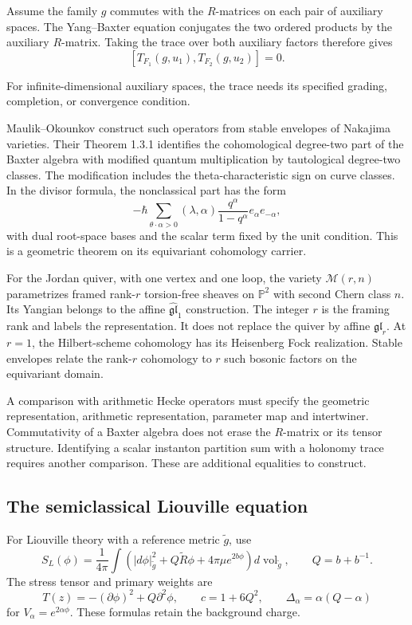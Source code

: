 Assume the family $g$ commutes with the $R$-matrices on each pair of
auxiliary spaces. The Yang--Baxter equation conjugates the two ordered
products by the auxiliary $R$-matrix. Taking the trace over both auxiliary
factors therefore gives
\[
 [T_{F_1}(g,u_1),T_{F_2}(g,u_2)]=0.
\]

For infinite-dimensional auxiliary spaces, the trace needs its specified
grading, completion, or convergence condition.

Maulik--Okounkov construct such operators from stable envelopes of Nakajima
varieties. Their Theorem 1.3.1 identifies the cohomological degree-two part
of the Baxter algebra with modified quantum multiplication by tautological
degree-two classes. The modification includes the theta-characteristic sign
on curve classes. In the divisor formula, the nonclassical part has the form
\[
 -\hbar\sum_{\theta\cdot\alpha>0}
     (\lambda,\alpha)\frac{q^\alpha}{1-q^\alpha}
                   e_\alpha e_{-\alpha},
\]
with dual root-space bases and the scalar term fixed by the unit condition.
This is a geometric theorem on its equivariant cohomology carrier.

For the Jordan quiver, with one vertex and one loop, the variety $\mathcal
M(r,n)$ parametrizes framed rank-$r$ torsion-free sheaves on $\mathbb P^2$
with second Chern class $n$. Its Yangian belongs to the affine
$\widehat{\mathfrak{gl}}_1$ construction. The integer $r$ is the framing
rank and labels the representation. It does not replace the quiver by affine
$\mathfrak{gl}_r$. At $r=1$, the Hilbert-scheme cohomology has its
Heisenberg Fock realization. Stable envelopes relate the rank-$r$ cohomology
to $r$ such bosonic factors on the equivariant domain.

A comparison with arithmetic Hecke operators must specify the geometric
representation, arithmetic representation, parameter map and intertwiner.
Commutativity of a Baxter algebra does not erase the $R$-matrix or its
tensor structure. Identifying a scalar instanton partition sum with a
holonomy trace requires another comparison. These are additional equalities
to construct.

\subsection{The semiclassical Liouville equation}

For Liouville theory with a reference metric $\widetilde g$, use
\[
 S_L(\phi)=\frac1{4\pi}\int
    \left(|d\phi|_{\widetilde g}^2+
          Q\widetilde R\phi+4\pi\mu e^{2b\phi}\right)
                         d\operatorname{vol}_{\widetilde g},
 \qquad Q=b+b^{-1}.
\]
The stress tensor and primary weights are
\[
 T(z)=-(\partial\phi)^2+Q\partial^2\phi,\qquad
 c=1+6Q^2,\qquad
 \Delta_\alpha=\alpha(Q-\alpha)
\]
for $V_\alpha=e^{2\alpha\phi}$. These formulas retain the background charge.

